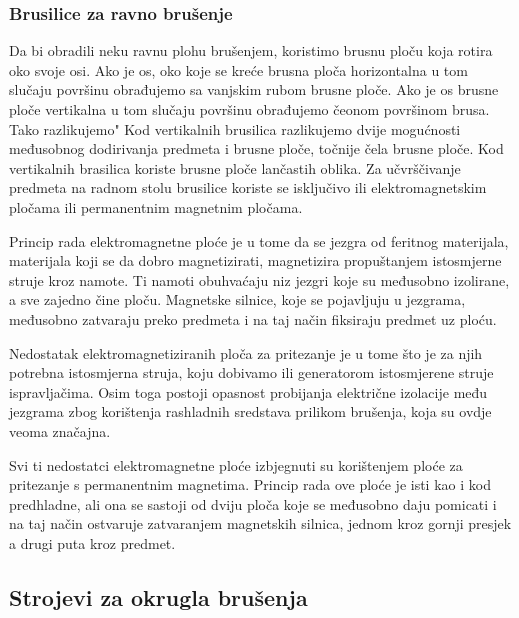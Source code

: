 \documentclass[a4paper,12pt]{article}
\numberwithin{figure}{section}
\begin{document}
\subsubsection{Brusilice za ravno brušenje}
Da bi obradili neku ravnu plohu brušenjem, koristimo brusnu ploču koja rotira oko svoje osi. Ako je os, oko koje se kreće brusna ploča horizontalna u tom slučaju površinu obrađujemo sa vanjskim rubom brusne ploče. Ako je os brusne ploče vertikalna u tom slučaju površinu obrađujemo čeonom površinom brusa. Tako razlikujemo"
Kod vertikalnih brusilica razlikujemo dvije mogućnosti međusobnog dodirivanja predmeta i brusne ploče, točnije čela brusne ploče. Kod vertikalnih brasilica koriste brusne ploče lančastih oblika.
Za učvrščivanje predmeta na radnom stolu brusilice koriste se isključivo ili elektromagnetskim pločama ili permanentnim magnetnim pločama.\par
Princip rada elektromagnetne ploće je u tome da se jezgra od feritnog materijala, materijala koji se da dobro magnetizirati, magnetizira propuštanjem istosmjerne struje kroz namote. Ti namoti obuhvaćaju niz jezgri koje su međusobno izolirane, a sve zajedno čine ploču. Magnetske silnice, koje se pojavljuju u jezgrama, međusobno zatvaraju preko predmeta i na taj način fiksiraju predmet uz ploću.\par
Nedostatak elektromagnetiziranih ploča za pritezanje je u tome što je za njih potrebna istosmjerna struja, koju dobivamo ili generatorom istosmjerene struje ispravljačima. Osim toga postoji opasnost probijanja električne izolacije među jezgrama zbog korištenja rashladnih sredstava prilikom brušenja, koja su ovdje veoma značajna.\par
Svi ti nedostatci elektromagnetne ploće izbjegnuti su korištenjem ploće za pritezanje s permanentnim magnetima. Princip rada ove ploće je isti kao i kod predhladne, ali ona se sastoji od dviju ploča koje se međusobno daju pomicati i na taj način ostvaruje zatvaranjem magnetskih silnica, jednom kroz gornji presjek a drugi puta kroz predmet. 
\subsection{Strojevi za okrugla brušenja}
\end{document}
